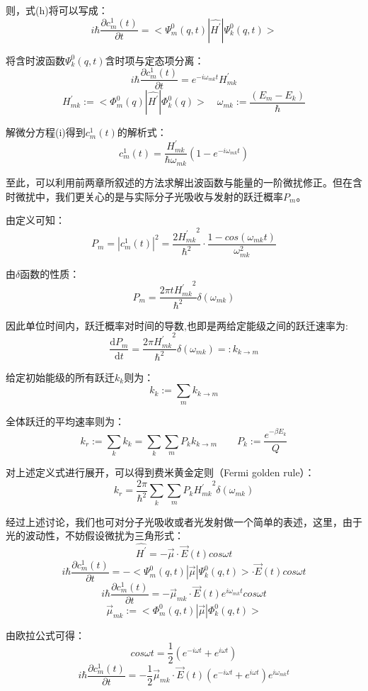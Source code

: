 则，式(h)将可以写成：
\[i \hbar \frac{\partial c_m^1(t)}{\partial t}=<\varPsi_m^0(q,t)|\hat{H^{'}}|\varPsi_k^0(q,t)>\]

将含时波函数$\varPsi_k^0(q,t)$含时项与定态项分离：
\[i \hbar \frac{\partial c_m^1(t)}{\partial t}=e^{-i \omega_{mk} t}H^{'}_{mk} \tag{i}\]
\[H^{'}_{mk}:=<\varPhi_m^0(q)|\hat{H^{'}}|\varPhi_k^0(q)> \quad \omega_{mk}:=\frac{(E_m-E_k)}{\hbar}\]

解微分方程(i)得到$c_m^1(t)$的解析式：
\[c_m^1(t)=\frac{H^{'}_{mk}}{\hbar \omega_{mk}}(1-e^{-i \omega_{mk} t})\]

至此，可以利用前两章所叙述的方法求解出波函数与能量的一阶微扰修正。但在含时微扰中，我们更关心的是与实际分子光吸收与发射的跃迁概率$P_m$。

由定义可知：
\[P_m=|c_m^1(t)|^2=\frac{2{H^{'}_{mk}}^2}{\hbar^2 } \cdot \frac{1-cos(\omega_{mk}t)}{\omega_{mk}^2}\]

由$\delta$函数的性质：
\[P_m=\frac{2 \pi t{H^{'}_{mk}}^2}{\hbar^2 }\delta(\omega_{mk})\]

因此单位时间内，跃迁概率对时间的导数,也即是两给定能级之间的跃迁速率为:
\[\frac{\mathrm{d} P_m}{\mathrm{d} t}=\frac{2 \pi {H^{'}_{mk}}^2}{\hbar^2 }\delta(\omega_{mk})=:k_{k \rightarrow m}\]

给定初始能级的所有跃迁$k_{k}$则为：
\[k_{k}:=\sum_mk_{k \rightarrow m}\]

全体跃迁的平均速率则为：
\[k_r:=\sum_kk_{k}=\sum_k\sum_m P_k k_{k \rightarrow m} \qquad P_k:=\frac{e^{-\beta E_k}}{Q}\]

对上述定义式进行展开，可以得到费米黄金定则（Fermi golden rule）：
\[k_r=\frac{2 \pi}{\hbar^2}\sum_k\sum_m P_k {H^{'}_{mk}}^2\delta(\omega_{mk})\]

经过上述讨论，我们也可对分子光吸收或者光发射做一个简单的表述，这里，由于光的波动性，不妨假设微扰为三角形式：
\[\hat{H^{'}}=-\overrightarrow{\mu} \cdot \overrightarrow{E}(t)cos\omega t\]
\[i \hbar \frac{\partial c_m^1(t)}{\partial t}=-<\varPsi_m^0(q,t)|\overrightarrow{\mu}|\varPsi_k^0(q,t)>\cdot \overrightarrow{E}(t)cos\omega t\]
\[i \hbar \frac{\partial c_m^1(t)}{\partial t}=-\overrightarrow{\mu}_{mk} \cdot \overrightarrow{E}(t) e^{i \omega_{mk}t}cos\omega t\]
\[\overrightarrow{\mu}_{mk}:=<\varPhi_m^0(q,t)|\overrightarrow{\mu}|\varPhi_k^0(q,t)>\]

由欧拉公式可得：
\[cos\omega t=\frac{1}{2}(e^{-i\omega t}+e^{i \omega t})\]
\[i \hbar \frac{\partial c_m^1(t)}{\partial t}=-\frac{1}{2}\overrightarrow{\mu}_{mk} \cdot \overrightarrow{E}(t)(e^{-i\omega t}+e^{i \omega t}) e^{i \omega_{mk}t}\]

